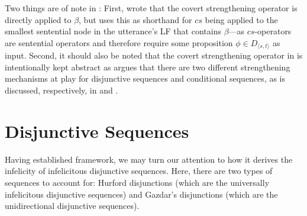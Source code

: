 Two things are of note in : First, \textcite{Ippolito2020} wrote that the covert strengthening operator is directly applied to $\beta$, but uses this as shorthand for $cs$ being applied to the smallest sentential node in the utterance's LF that contains $\beta$---as $cs$-operators are sentential operators and therefore require some proposition $\phi\in D_{\langle s,t\rangle}$ as input. Second, it should also be noted that the covert strengthening operator in  is intentionally kept abstract as \textcite{Ippolito2020} argues that there are two different strengthening mechanisms at play for disjunctive sequences and conditional sequences, as is discussed, respectively, in  and . 

\section{Disjunctive Sequences}
Having established  framework, we may turn our attention to how it derives the infelicity of infelicitous disjunctive sequences. Here, there are two types of sequences to account for: Hurford disjunctions (which are the universally infelicitous disjunctive sequences) and Gazdar's disjunctions (which are the unidirectional disjunctive sequences).


